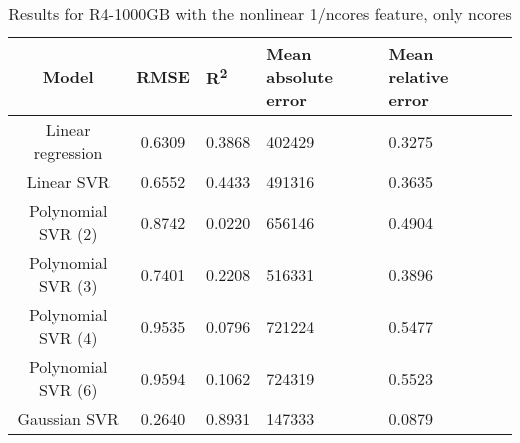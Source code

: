 \begin{table}[H]
\centering
\begin{adjustbox}{center}
\begin{tabular}{c | c M{1.2cm} M{2.5cm} M{2.5cm} M{1.8cm}}
Model & RMSE & R\textsuperscript{2} & Mean absolute error & Mean relative error \tabularnewline
\hline
Linear regression & 0.6309 & 0.3868 & 402429 & 0.3275 \\
Linear SVR & 0.6552 & 0.4433 & 491316 & 0.3635 \\
Polynomial SVR (2) & 0.8742 & 0.0220 & 656146 & 0.4904 \\
Polynomial SVR (3) & 0.7401 & 0.2208 & 516331 & 0.3896 \\
Polynomial SVR (4) & 0.9535 & 0.0796 & 721224 & 0.5477 \\
Polynomial SVR (6) & 0.9594 & 0.1062 & 724319 & 0.5523 \\
Gaussian SVR & 0.2640 & 0.8931 & 147333 & 0.0879 \\
\end{tabular}
\end{adjustbox}
\\
\caption{Results for R4-1000GB with the nonlinear 1/ncores feature, only ncores}
\label{tab:all_nonlinear_R4_1000}
\end{table}
